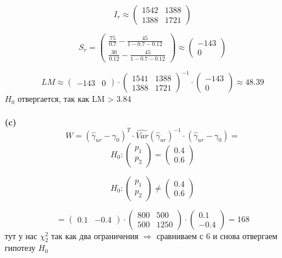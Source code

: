 \documentclass[a4paper, 12pt]{article} %
\begin{document}
\[
I_r \approx
 \begin{pmatrix}
    1542 &  1388 \\
    1388 & 1721
\end{pmatrix}	
\]

\[S_r =
 \begin{pmatrix}
    \frac{75}{0.7} - \frac{45}{1- 0.7 - 0.12} \\
    \frac{30}{0.12} - \frac{45}{1- 0.7 - 0.12}
\end{pmatrix} \approx 
\begin{pmatrix}
    -143 \\
    0
\end{pmatrix} 
\]

\[LM \approx
\begin{pmatrix}
    -143
    & 0
\end{pmatrix} \cdot 
\begin{pmatrix}
    1541 &  1388 \\
    1388 & 1721
\end{pmatrix}^{-1} \cdot
\begin{pmatrix}
    -143 \\
    0
\end{pmatrix} \approx 48.39\]
$H_0$ отвергается, так как LM > 3.84
\\\\\textbf{(c)}
\[
W = (\hat \gamma_{ur} - \gamma_0)^T \cdot \widehat{Var}(\hat \gamma_{ur})^{-1} 
\cdot (\hat \gamma_{ur} - \gamma_0) = 
\]
\[
H_0 : \begin{pmatrix}
    p_1 \\ p_2    
\end{pmatrix} = \begin{pmatrix}
    0.4 \\ 0.6
\end{pmatrix}
\]

\[
H_0 : \begin{pmatrix}
    p_1 \\ p_2    
\end{pmatrix} \neq \begin{pmatrix}
    0.4 \\ 0.6
\end{pmatrix}
\]


\[
=\begin{pmatrix}
    0.1
    & -0.4
\end{pmatrix} \cdot 
\begin{pmatrix}
    800 &  500 \\
    500 & 1250
\end{pmatrix} \cdot
\begin{pmatrix}
    0.1 \\
    -0.4
\end{pmatrix} = 168
\] 
тут у нас $\chi^2_2$ так как два ограничения  $\Rightarrow$ сравниваем с 6 и снова отвергаем гипотезу $H_0$
\end{document}
